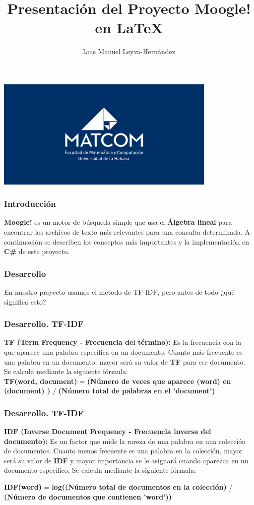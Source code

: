 \documentclass{beamer}
\title{Presentación del Proyecto Moogle! en \LaTeX}
\author{Luis Manuel Leyva-Hernández}
\begin{document}
    \begin{frame}
        \frametitle{}
        \centering
        \includegraphics[width=0.8\textwidth]{87f4e980-62a6-11eb-846f-4c58547cffc0.png}
        \maketitle
    \end{frame}

    \begin{frame}
        \frametitle{Introducción}
        \textbf{Moogle!} es un motor de búsqueda simple que usa el \textbf{Álgebra lineal} para encontrar los archivos de texto más relevantes para una consulta determinada. A continuación se describen los conceptos más importantes y la implementación en \textbf{C\#} de este proyecto.
    \end{frame}
    
    \begin{frame}
        \frametitle{Desarrollo}
        En nuestro proyecto usamos el metodo de TF-IDF, pero antes de todo ¿qué significa esto?
    \end{frame}

    \begin{frame}
        \frametitle{Desarrollo. TF-IDF}
        \textbf{TF (Term Frequency - Frecuencia del término):} Es la frecuencia con la que aparece una palabra específica en un documento. Cuanto más frecuente es una palabra en un documento, mayor será su valor de \textbf{TF} para ese documento. Se calcula mediante la siguiente fórmula:\\

        \textbf{TF(word, document)} = \textbf{(Número de veces que aparece (word) en (document) )} / \textbf{(Número total de palabras en el 'document')}

    \end{frame}

    \begin{frame}
        \frametitle{Desarrollo. TF-IDF}
        \textbf{IDF (Inverse Document Frequency - Frecuencia inversa del documento):} Es un factor que mide la rareza de una palabra en una colección de documentos. Cuanto menos frecuente es una palabra en la colección, mayor será su valor de \textbf{IDF} y mayor importancia se le asignará cuando aparezca en un documento específico. Se calcula mediante la siguiente fórmula:

        \textbf{IDF(word)} = \textbf{log((Número total de documentos en la colección)} / \textbf{(Número de documentos que contienen 'word'))}
    \end{frame}
\end{document}
